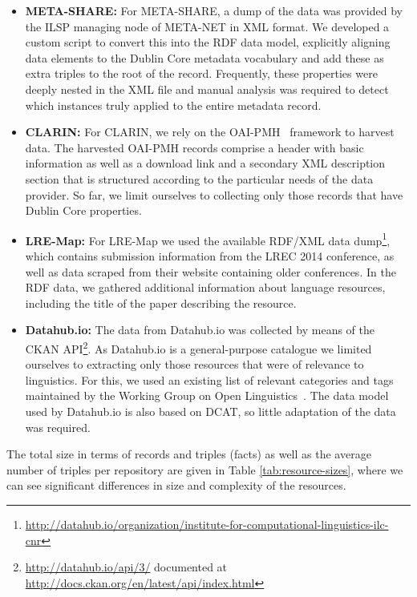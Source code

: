 \documentclass[11pt]{article}
\begin{document}
\begin{itemize}
\item \textbf{META-SHARE:} For META-SHARE, a dump of the data was
provided by the ILSP managing node of META-NET in XML format. We developed a custom script to convert this
into the RDF data model, explicitly aligning data elements to the
Dublin Core metadata vocabulary and add these as extra triples to the root
of the record. Frequently, these properties were deeply nested in the XML file
and manual analysis was required to detect which instances truly applied to the
entire metadata record.

\item \textbf{CLARIN:} For CLARIN, we rely on the OAI-PMH~\cite{sompel2004resource} framework to harvest data.
The harvested OAI-PMH records comprise a header with basic information as well as a download link and a secondary XML description
section that is structured according to the particular needs of the data provider.
So far, we limit ourselves to collecting only those records that
have Dublin Core properties.
\item \textbf{LRE-Map:} For LRE-Map we used the available RDF/XML data
    dump\footnote{\url{http://datahub.io/organization/institute-for-computational-linguistics-ilc-cnr}},
    which contains submission information from the LREC 2014 conference, as well as data
    scraped from their website containing older conferences.
    In the RDF data, we gathered additional
    information about language resources, including the title of the paper 
    describing the resource.
\item \textbf{Datahub.io:} The data from Datahub.io was collected by means of
    the CKAN API\footnote{\url{http://datahub.io/api/3/} documented at
    \url{http://docs.ckan.org/en/latest/api/index.html}}. As Datahub.io
is a general-purpose catalogue we limited ourselves to extracting only those
resources that were of relevance to linguistics. For this, we used an existing
list of relevant categories and tags maintained by the Working Group on Open
Linguistics~\cite{chiarcos2012open}. The data model used by Datahub.io is 
also based on DCAT, so little adaptation of the data was required.
\end{itemize}

The total size in terms of records and triples (facts) as well as the average
number of triples per repository are given in Table \ref{tab:resource-sizes}, where
we can see significant differences in size and complexity of the resources.
\end{document}
